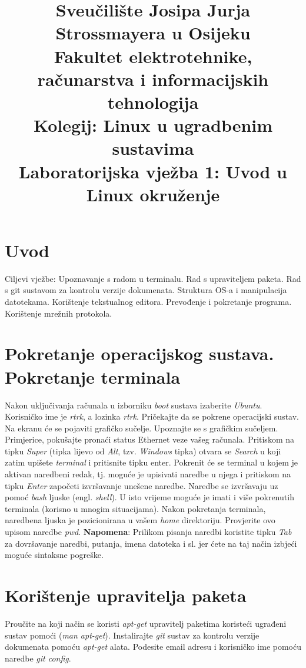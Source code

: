 \documentclass[11pt]{article}
\title{
	\Large Sveučilište Josipa Jurja Strossmayera u Osijeku \\
	Fakultet elektrotehnike, računarstva i informacijskih tehnologija \\
	\vspace{4cm}
	\Large Kolegij: Linux u ugradbenim sustavima \\
	\vspace{4cm}
	\Large \textbf{Laboratorijska vježba 1: Uvod u Linux okruženje}
	}
\date{}
\begin{document}
\maketitle
\thispagestyle{empty}
\newpage

\section{Uvod}
Ciljevi vježbe: Upoznavanje s radom u terminalu. Rad s upraviteljem paketa.
Rad s git sustavom za kontrolu verzije dokumenata. Struktura OS-a i manipulacija datotekama. Korištenje tekstualnog
editora. Prevođenje i pokretanje programa. Korištenje mrežnih protokola.

\section{Pokretanje operacijskog sustava. Pokretanje terminala}
Nakon uključivanja računala u izborniku \textit{boot} sustava izaberite
\textit{Ubuntu}. Korisničko ime je \textit{rtrk}, a lozinka \textit{rtrk}.
Pričekajte da se pokrene operacijski sustav. Na ekranu će se pojaviti
grafičko sučelje. Upoznajte se s grafičkim sučeljem. Primjerice, pokušajte
pronaći status Ethernet veze vašeg računala.
\newline
\newline
Pritiskom na tipku \textit{Super} (tipka lijevo od \textit{Alt}, tzv.
\textit{Windows} tipka) otvara se \textit{Search} u koji zatim upišete
 \textit{terminal} i pritisnite tipku enter. Pokrenit će se terminal u kojem je
 aktivan naredbeni redak, tj. moguće je upisivati naredbe u njega i pritiskom
 na tipku \textit{Enter} započeti izvršavanje unešene naredbe. Naredbe se
 izvršavaju uz pomoć \textit{bash} ljuske (engl. \textit{shell}). U isto
 vrijeme moguće je imati i više pokrenutih terminala (korisno u mnogim
 situacijama). Nakon pokretanja terminala, naredbena ljuska je pozicionirana
 u vašem \textit{home} direktoriju. Provjerite ovo upisom naredbe \textit{pwd}.
\newline
\newline
\textbf{Napomena}: Prilikom pisanja naredbi koristite tipku \textit{Tab} za
 dovršavanje naredbi, putanja, imena datoteka i sl. jer ćete na taj način
 izbjeći moguće sintaksne pogreške.

\section{Korištenje upravitelja paketa}
Proučite na koji način se koristi \textit{apt-get} upravitelj paketima
 koristeći ugrađeni sustav pomoći (\textit{man apt-get}). Instalirajte
 \textit{git} sustav za kontrolu verzije dokumenata pomoću \textit{apt-get}
 alata. Podesite email adresu i korisničko ime pomoću naredbe
 \textit{git config}.
\end{document}
